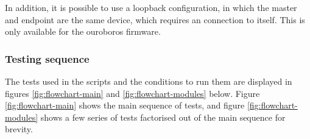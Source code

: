 \documentclass{dune}
\begin{document}
In addition, it is possible to use a loopback configuration, in which the master and endpoint are the same device, which requires an  connection to itself.
This is only available for the ouroboros firmware.

\subsubsection{Testing sequence}
\label{sec:flowchart}
The tests used in the scripts and the conditions to run them are displayed in figures \ref{fig:flowchart-main} and \ref{fig:flowchart-modules} below.
Figure \ref{fig:flowchart-main} shows the main sequence of tests, and figure \ref{fig:flowchart-modules} shows a few series of tests factorised out of the main sequence for brevity.


\end{document}
